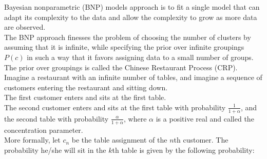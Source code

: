 \documentclass[12pt, a4paper]{paper}
\begin{document}
Bayesian nonparametric (BNP) models approach is to fit a single model that can adapt its complexity to the data and allow the complexity to grow as more data are observed. \\
The BNP approach finesses the problem of choosing the number of clusters by assuming that it is infinite, while specifying the prior over infinite groupings $P(c)$ in such a way that it favors assigning data to a small number of groups. The prior over groupings is called the Chinese Restaurant Process (CRP). \\
Imagine a restaurant with an infinite number of tables, and imagine a sequence of customers entering the restaurant and sitting down. \\
The first customer enters and sits at the first table. \\ The second customer enters and sits at the first table with probability $\frac{1}{1+\alpha}$, and the second table with probability $\frac{\alpha}{1+\alpha}$, where $\alpha$ is a positive real and called the concentration parameter. \\
More formally, let $c_{n}$ be the table assignment of the $n$th customer. The probability he/she will sit in the $k$th table is given by the following probability:
\end{document}
